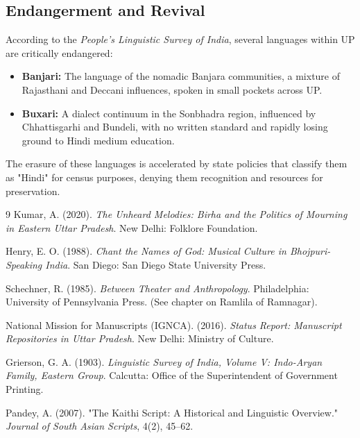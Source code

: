 \documentclass{article}
\begin{document}
\subsection{Endangerment and Revival}
According to the \textit{People's Linguistic Survey of India}, several languages within UP are critically endangered:
\begin{itemize}
    \item \textbf{Banjari:} The language of the nomadic Banjara communities, a mixture of Rajasthani and Deccani influences, spoken in small pockets across UP.
    \item \textbf{Buxari:} A dialect continuum in the Sonbhadra region, influenced by Chhattisgarhi and Bundeli, with no written standard and rapidly losing ground to Hindi medium education.
\end{itemize}
The erasure of these languages is accelerated by state policies that classify them as "Hindi" for census purposes, denying them recognition and resources for preservation.

\begin{thebibliography}{9}
  Kumar, A. (2020). \textit{The Unheard Melodies: Birha and the Politics of Mourning in Eastern Uttar Pradesh}. New Delhi: Folklore Foundation.

  Henry, E. O. (1988). \textit{Chant the Names of God: Musical Culture in Bhojpuri-Speaking India}. San Diego: San Diego State University Press.

  Schechner, R. (1985). \textit{Between Theater and Anthropology}. Philadelphia: University of Pennsylvania Press. (See chapter on Ramlila of Ramnagar).

  National Mission for Manuscripts (IGNCA). (2016). \textit{Status Report: Manuscript Repositories in Uttar Pradesh}. New Delhi: Ministry of Culture.

  Grierson, G. A. (1903). \textit{Linguistic Survey of India, Volume V: Indo-Aryan Family, Eastern Group}. Calcutta: Office of the Superintendent of Government Printing.

  Pandey, A. (2007). "The Kaithi Script: A Historical and Linguistic Overview." \textit{Journal of South Asian Scripts}, 4(2), 45–62.

\end{thebibliography}
\end{document}
